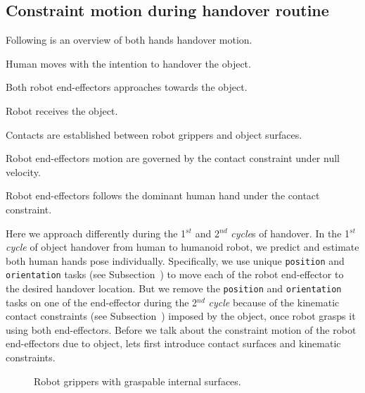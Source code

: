 \subsection{Constraint motion during handover routine}
Following is an overview of both hands handover motion.
\begin{compactitem}
	\item Human moves with the intention to handover the object.
	\item Both robot end-effectors approaches towards the object.
	\item Robot receives the object.
	\item Contacts are established between robot grippers and object surfaces.
	\item Robot end-effectors motion are governed by the contact constraint under null velocity.
	\item Robot end-effectors follows the dominant human hand under the contact constraint.
\end{compactitem}

Here we approach differently during the 1${}^{st}$ and 2${}^{nd}$ \textit{cycle}s of handover. In the 1${}^{st}$ \textit{cycle} of object handover from human to humanoid robot, we predict and estimate both human hands pose individually. Specifically, we use unique \texttt{position} and \texttt{orientation} tasks (see Subsection~) to move each of the robot end-effector to the desired handover location. But we remove the \texttt{position} and \texttt{orientation} tasks on one of the end-effector during the 2${}^{nd}$ \textit{cycle} because of the kinematic contact constraints (see Subsection~) imposed by the object, once robot grasps it using both end-effectors. Before we talk about the constraint motion of the robot end-effectors due to object, lets first introduce contact surfaces and kinematic constraints.

\begin{figure}[hptb]
	\caption{Robot grippers with graspable internal surfaces.}
	\label{fig:gripper-intern}
\end{figure}


